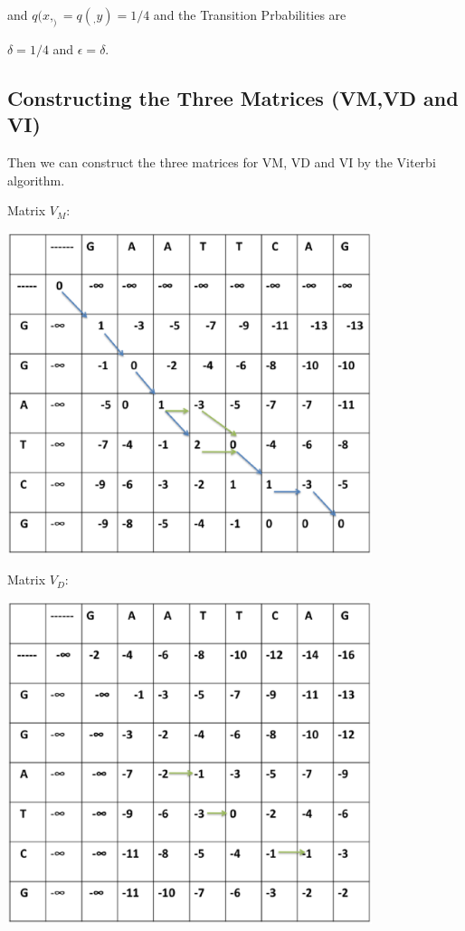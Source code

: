 \documentclass[english, a4paper,11pt]{article}
\begin{document}
and  $q(x,_)=q(_,y)=1/4$
and the Transition Prbabilities are

$\delta=1/4$ and $\epsilon=\delta$.

\subsection{Constructing the Three Matrices (VM,VD and VI)}

Then we can construct the three matrices for VM, VD and VI by the Viterbi
algorithm.

Matrix $V_M$:
\begin{center}
\includegraphics[width=0.8\textwidth]{Slide1}
\end{center}

\newpage
Matrix $V_D$:
\begin{center}
\includegraphics[width=0.8\textwidth]{Slide2}
\end{center}
\end{document}
